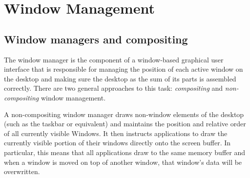 \documentclass[10pt,twocolumn,a4paper]{article}
\begin{document}
	\section{Window Management}
		\subsection{Window managers and compositing}
			The window manager is the component of a window-based graphical user
			interface that is responsible for managing the position of each active
			window on the desktop and making sure the desktop as the sum of its
			parts is assembled correctly. There are two general approaches to this
			task: \emph{compositing} and \emph{non-compositing} window management.

			A non-compositing window manager draws non-window elements of the
			desktop (such as the taskbar or equivalent) and maintains the
			position and relative order of all currently visible Windows. It
			then instructs applications to draw the currently visible portion
			of their windows directly onto the screen buffer. In particular,
			this means that all applications draw to the same memory buffer and
			when a window is moved on top of another window, that window's data
			will be overwritten.
\end{document}
